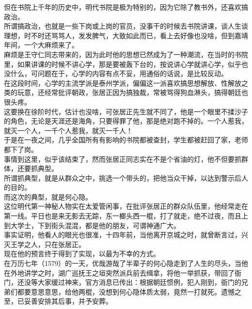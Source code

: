 \begin{multicols}{\theparacolNo}
但在书院上千年的历史中，明代书院是极为特别的，因为它除了教书外，还喜欢搞政治。\\

所谓搞政治，也就是一些下岗或上岗的官员，没事干的时候去书院讲课，谈人生谈理想，时不时还骂骂人，发发脾气，大致如此而已，看上去好像也没啥，但到嘉靖年间，一个大麻烦来了。\\

麻烦是王守仁同志带来的，因为此时他的思想已然成为了一种潮流，在当时的书院里，如果讲课的时候不讲心学，那是要被轰下台的，按说讲心学就讲心学，似乎也没什么，可问题在于，心学的内容有点不妥，用通俗的话说，是比较反动。\\

在这段时间，心学的主流学派是泰州学派，偏偏这一派喜欢搞思想解放、性解放之类的玩意，还经常批评朝政，张居正因为搞独裁，常被骂得狗血淋头，搞得朝廷也很头疼。\\

这要换在徐阶时代，估计也没啥，可张居正先生就不同了，他是一个眼里不揉沙子的角色，无论是天涯还是海角，只要得罪了他，那是绝对跑不掉的。一个人惹我，就灭一个人，一千个人惹我，就灭一千人！\\

于是在一夜之间，几乎全国所有有影响的书院都被查封，学生都被赶回了家，老师都下了岗。\\

事情到这里，似乎该结束了，然而张居正同志实在不是个省油的灯，他不但要抓群体，还要抓典型。\\

所谓抓典型，就是从群众之中，挑选一个带头的，把他当众干掉，以达到警示后人的目的。\\

而这次的典型，就是何心隐。\\

这位明代第一神秘人物实在太爱管闲事，在批评张居正的群众队伍里，他经常走在第一线。平日也是来无影去无踪，东一榔头西一棍，打了就走，绝不过夜，而且上到大学士，下到街头混混，都是他的朋友，可谓神通广大。\\

事实证明，他看人的眼光也很准，十四年前，当他离开京城之时，就曾断言过，兴灭王学之人，只在张居正。\\

现在他的预言终于得到了实现，以最为不幸的方式。\\

在万历七年（1579）的一天，优哉游哉了半辈子的何心隐走到了人生的尽头，当他在外地讲学之时，湖广巡抚王之垣突然派兵前去缉拿，将他一举抓获，带回了衙门，还没等大家缓过神来，官方消息已传出：根据朝廷惯例，犯人刚到，衙门的兄弟们都要意思意思，给他两棍，没想到何心隐体质太弱，竟然一打就死。遗憾之至，已妥善安排其后事，并予安葬。\\


\end{multicols}
